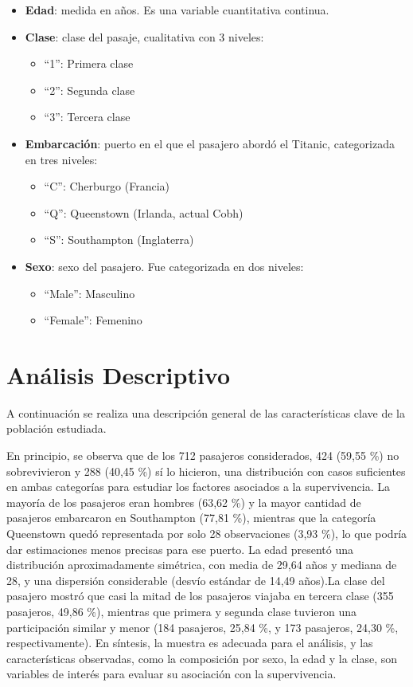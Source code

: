 \documentclass[
  spanish,
  11pt,
  letterpaper,
  DIV=11,
  numbers=noendperiod]{scrartcl}
\begin{document}
\begin{itemize}
  \item \textbf{Edad}: medida en años. Es una variable cuantitativa continua.

 \item \textbf{Clase}: clase del pasaje, cualitativa con 3 niveles:
 \begin{itemize}
    \item ``1'': Primera clase
    \item ``2'': Segunda clase
    \item ``3'': Tercera clase
  \end{itemize}
 
 \item \textbf{Embarcación}: puerto en el que el pasajero abordó el Titanic, categorizada en tres niveles:
  \begin{itemize}
    \item ``C'': Cherburgo (Francia)
    \item ``Q'': Queenstown (Irlanda, actual Cobh)
    \item ``S'': Southampton (Inglaterra)
  \end{itemize}

  \item \textbf{Sexo}: sexo del pasajero. Fue categorizada en dos niveles:
  \begin{itemize}
    \item “Male”: Masculino
    \item “Female”: Femenino
  \end{itemize}
\end{itemize}

\section{Análisis Descriptivo}\label{anuxe1lisis-descriptivo}

A continuación se realiza una descripción general de las características
clave de la población estudiada.

En principio, se observa que de los 712 pasajeros considerados, 424
(59,55 \%) no sobrevivieron y 288 (40,45 \%) sí lo hicieron, una
distribución con casos suficientes en ambas categorías para estudiar los
factores asociados a la supervivencia. La mayoría de los pasajeros eran
hombres (63,62 \%) y la mayor cantidad de pasajeros embarcaron en
Southampton (77,81 \%), mientras que la categoría Queenstown quedó
representada por solo 28 observaciones (3,93 \%), lo que podría dar
estimaciones menos precisas para ese puerto. La edad presentó una
distribución aproximadamente simétrica, con media de 29,64 años y
mediana de 28, y una dispersión considerable (desvío estándar de 14,49
años).La clase del pasajero mostró que casi la mitad de los pasajeros
viajaba en tercera clase (355 pasajeros, 49,86 \%), mientras que primera
y segunda clase tuvieron una participación similar y menor (184
pasajeros, 25,84 \%, y 173 pasajeros, 24,30 \%, respectivamente). En
síntesis, la muestra es adecuada para el análisis, y las características
observadas, como la composición por sexo, la edad y la clase, son
variables de interés para evaluar su asociación con la supervivencia.
\end{document}
